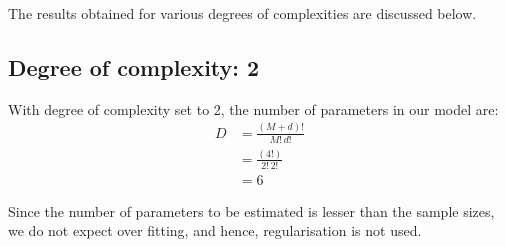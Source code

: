 \documentclass[12pt,a4paper]{article}
\newcommand{\noi}{\noindent}
\begin{document}
The results obtained for various degrees of complexities are discussed below. 

\subsection{Degree of complexity: 2}
With degree of complexity set to 2, the number of parameters in our model are:
\begin{equation}
\begin{split}
 D &= \frac{(M+d)!}{M!\,d!} \\
   & =\frac{(4!)}{2!\,2!} \\
   & =6
\end{split}
\end{equation}

\noi
Since the number of parameters to be estimated is lesser than the sample sizes, we do not expect over fitting, and hence, regularisation is not used. 
\end{document}

